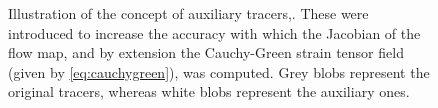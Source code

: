 \begin{figure}[htpb]
    \centering
    \def\svgwidth{0.8\linewidth}{}
    \caption[Illustration of the concept of auxiliary tracers]
    {Illustration of the concept of auxiliary tracers,. These were introduced
        to increase the accuracy with which the Jacobian of the flow map,
        and by extension the Cauchy-Green strain tensor field (given by
        \cref{eq:cauchygreen}), was computed. Grey blobs represent the original
        tracers, whereas white blobs
        represent the auxiliary ones.}
    \label{fig:auxiliarygrid}
\end{figure}
